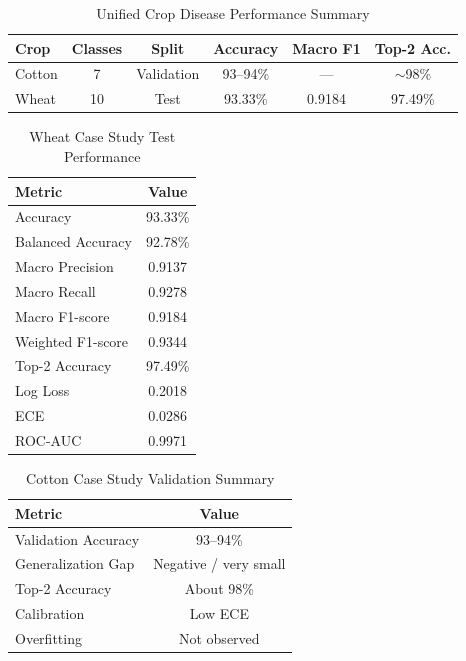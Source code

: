 \documentclass[conference]{IEEEtran}
\begin{document}
\begin{table}[t]
\centering
\caption{Unified Crop Disease Performance Summary}
\label{tab:unified-performance}
\begin{tabular}{lccccc}
\hline
Crop & Classes & Split & Accuracy & Macro F1 & Top-2 Acc. \\
\hline
Cotton & 7 & Validation & 93--94\% & --- & $\sim$98\% \\
Wheat & 10 & Test & 93.33\% & 0.9184 & 97.49\% \\
\hline
\end{tabular}
\end{table}

\begin{table}[t]
\centering
\caption{Wheat Case Study Test Performance}
\label{tab:wheat-performance}
\begin{tabular}{lc}
\hline
Metric & Value \\
\hline
Accuracy & 93.33\% \\
Balanced Accuracy & 92.78\% \\
Macro Precision & 0.9137 \\
Macro Recall & 0.9278 \\
Macro F1-score & 0.9184 \\
Weighted F1-score & 0.9344 \\
Top-2 Accuracy & 97.49\% \\
Log Loss & 0.2018 \\
ECE & 0.0286 \\
ROC-AUC & 0.9971 \\
\hline
\end{tabular}
\end{table}

\begin{table}[t]
\centering
\caption{Cotton Case Study Validation Summary}
\label{tab:cotton-performance}
\begin{tabular}{lc}
\hline
Metric & Value \\
\hline
Validation Accuracy & 93--94\% \\
Generalization Gap & Negative / very small \\
Top-2 Accuracy & About 98\% \\
Calibration & Low ECE \\
Overfitting & Not observed \\
\hline
\end{tabular}
\end{table}
\end{document}

